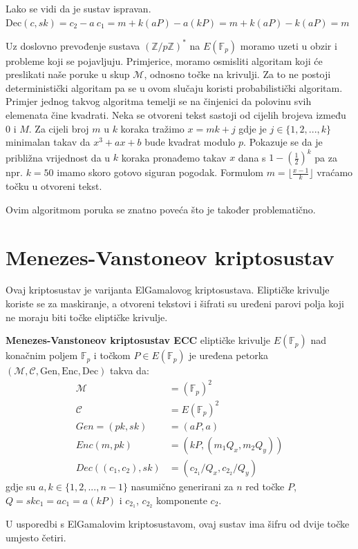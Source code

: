 \documentclass{mathos}
\begin{document}
\begin{nap}
    Lako se vidi da je sustav ispravan. $\text{Dec}(c, sk) = c_2 - a \ c_1 = m + k(aP) - a(kP) = m + k(aP) - k(aP) = m$
\end{nap}

Uz doslovno prevođenje sustava $(\mathbb{Z}/p\mathbb{Z})^*$ na $E(\mathbb{F}_p)$ moramo uzeti u obzir i probleme koji se pojavljuju. Primjerice, moramo osmisliti algoritam koji će preslikati naše poruke u skup $\mathcal{M}$, odnosno točke na krivulji. Za to ne postoji deterministički algoritam pa se u ovom slučaju koristi probabilistički algoritam. Primjer jednog takvog algoritma temelji se na činjenici da polovinu svih elemenata čine kvadrati. Neka se otvoreni tekst sastoji od cijelih brojeva između $0$ i $M$. Za cijeli broj $m$ u $k$ koraka tražimo $x = mk + j$ gdje je $j\in\{1, 2, ..., k\}$ minimalan takav da $x^3 + ax + b$ bude kvadrat modulo $p$. Pokazuje se da je približna vrijednost da u $k$ koraka pronađemo takav $x$ dana s $1 - (\frac{1}{2})^k$ pa za npr. $k = 50$ imamo skoro gotovo siguran pogodak. Formulom $m = \lfloor \frac{x-1}{k} \rfloor$ vraćamo točku u otvoreni tekst.

\begin{nap}
    Ovim algoritmom poruka se znatno poveća što je također problematično.
\end{nap}


\section{Menezes-Vanstoneov kriptosustav}
Ovaj kriptosustav je varijanta ElGamalovog kriptosustava. Eliptičke krivulje koriste se za maskiranje, a otvoreni tekstovi i šifrati su uređeni parovi polja koji ne moraju biti točke eliptičke krivulje.

\begin{defin}
    \textbf{Menezes-Vanstoneov kriptosustav ECC} eliptičke krivulje $E(\mathbb{F}_p)$ nad konačnim poljem $\mathbb{F}_p$ i točkom $P\in E(\mathbb{F}_p)$ je uređena petorka $(\mathcal{M}, \mathcal{C}, \text{Gen}, \text{Enc}, \text{Dec})$ takva da:
    \begin{align*}
        \mathcal{M} & = (\mathbb{F}_p)^2 \\
        \mathcal{C} & = E(\mathbb{F}_p)^2 \\
        Gen = (pk, sk) & = (aP, a) \\
        Enc(m, pk) & = (kP, (m_1 Q_x, m_2 Q_y)) \\
        Dec((c_1, c_2), sk) & = (c_{2_1}/Q_x, c_{2_2}/Q_y)
    \end{align*}
    gdje su $a, k \in \{ 1, 2, ..., n-1 \}$ nasumično generirani za $n$ red točke $P$, $Q = sk c_1 = a c_1 = a(kP)$ i $c_{2_1}$, $c_{2_2}$ komponente $c_2$.
\end{defin}
U usporedbi s ElGamalovim kriptosustavom, ovaj sustav ima šifru od dvije točke umjesto četiri.
\end{document}
